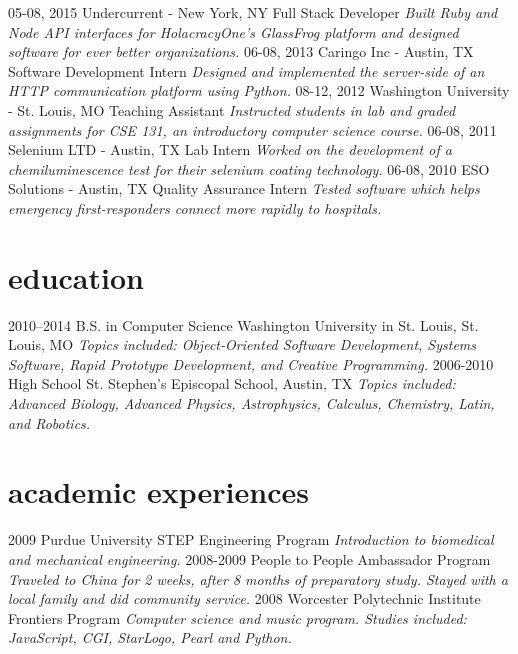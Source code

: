 \documentclass[]{cv}
\begin{document}
\begin{entrylist}
  \entry
    {05-08, 2015}
    {Undercurrent - New York, NY}
    {Full Stack Developer}
    {\emph{Built Ruby and Node API interfaces for HolacracyOne's GlassFrog platform and designed software for ever better organizations.}}
  \entry
    {06-08, 2013}
    {Caringo Inc - Austin, TX}
    {Software Development Intern}
    {\emph{Designed and implemented the server-side of an HTTP communication platform using Python.}}
  \entry
    {08-12, 2012}
    {Washington University - St. Louis, MO}
    {Teaching Assistant}
    {\emph{Instructed students in lab and graded assignments for CSE 131, an introductory computer science course.}}
  \entry
    {06-08, 2011}
    {Selenium LTD - Austin, TX}
    {Lab Intern}
    {\emph{Worked on the development of a chemiluminescence test for their selenium coating technology.}}
  \entry
    {06-08, 2010}
    {ESO Solutions - Austin, TX}
    {Quality Assurance Intern}
    {\emph{Tested software which helps emergency first-responders connect more rapidly to hospitals.}}
\end{entrylist}

\section{education}

\begin{entrylist}
  \entry
    {2010–2014}
    {B.S. in Computer Science}
    {Washington University in St. Louis, St. Louis, MO}
    {\emph{Topics included: Object‐Oriented Software Development, Systems Software, Rapid Prototype Development, and Creative Programming.}}
  \entry
    {2006-2010}
    {High School}
    {St. Stephen’s Episcopal School, Austin, TX}
    {\emph{Topics included: Advanced Biology, Advanced Physics, Astrophysics, Calculus, Chemistry, Latin, and Robotics.}}
\end{entrylist}

\section{academic experiences}

\begin{entrylist}
  \entry
    {2009}
    {Purdue University STEP Engineering Program}{}
    {\emph{Introduction to biomedical and mechanical engineering.}}
  \entry
    {2008-2009}
    {People to People Ambassador Program}{}
    {\emph{Traveled to China for 2 weeks, after 8 months of preparatory study. Stayed with a local family and did community service.}}
  \entry
    {2008}
    {Worcester Polytechnic Institute Frontiers Program}{}
    {\emph{Computer science and music program. Studies included: JavaScript, CGI, StarLogo, Pearl and Python.}}
\end{entrylist}
\end{document}
